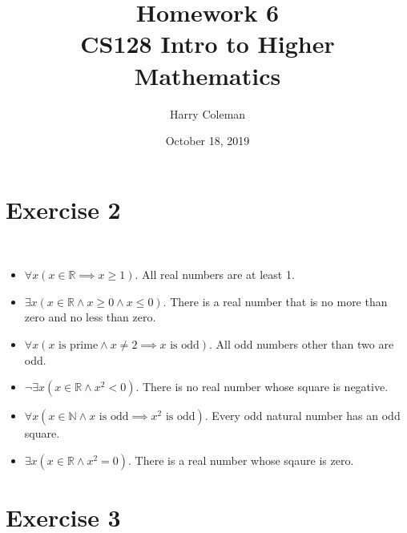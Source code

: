 \documentclass[11pt]{article}
\newcommand{\N}{\mathbb{N}}
\newcommand{\R}{\mathbb{R}}
\begin{document}
 
\title{Homework 6\\
    \large CS128 Intro to Higher Mathematics}
\author{Harry Coleman}
\date{October 18, 2019}

\maketitle

\section*{Exercise 2}
\\

\begin{itemize}
    \item $\forall x(x \in \R \implies x \geq 1)$. All real numbers are at least 1.
    \item $\exists x(x \in \R \land x \geq 0 \land x \leq 0)$. There is a real number that is no more than zero and no less than zero.
    \item $\forall x(x \text{ is prime} \land x \ne 2 \implies x \text{ is odd})$. All odd numbers other than two are odd.
    \item $\lnot\exists x(x \in \R \land x^2 < 0)$. There is no real number whose square is negative.
    \item $\forall x(x \in \N \land x \text{ is odd} \implies x^2 \text{ is odd})$. Every odd natural number has an odd square.
    \item $\exists x(x \in \R \land x^2 = 0)$. There is a real number whose sqaure is zero.
\end{itemize}

\section*{Exercise 3}
\\
\end{document}
